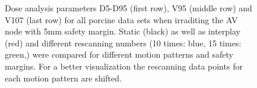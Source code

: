 \documentclass[type=dr, dr=rernat, accentcolor=tud7b,colorbacktitle, bigchapter, openright, twoside, 12pt ]{tudthesis}
\begin{document}
\begin{figure}[H]
{}
\caption{Dose analysis parameters D5-D95 (first row), V95 (middle row) and V107 (last row) for all porcine data sets when irraditing the AV 
node with 5mm safety margin. Static (black) as well as interplay (red) and different rescanning 
numbers (10 times: blue, 15 times: green,) were compared for different motion patterns and 
safety margins. For a better visualization the rescanning data points for each motion pattern are shifted.}
\label{static_interplay_rescanning_ALLpigs}
\end{figure}

\newpage

% 


\newpage
\end{document}
